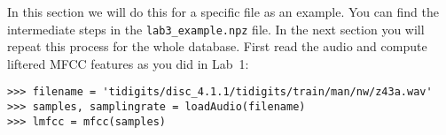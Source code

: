 \documentclass{nada-ten}
\begin{document}
In this section we will do this for a specific file as an example. You can find the intermediate steps in the \texttt{lab3\_example.npz} file. In the next section you will repeat this process for the whole database. First read the audio and compute liftered MFCC features as you did in Lab~1:
\begin{verbatim}
>>> filename = 'tidigits/disc_4.1.1/tidigits/train/man/nw/z43a.wav'
>>> samples, samplingrate = loadAudio(filename)
>>> lmfcc = mfcc(samples)
\end{verbatim}

%
%
%
\end{document}
